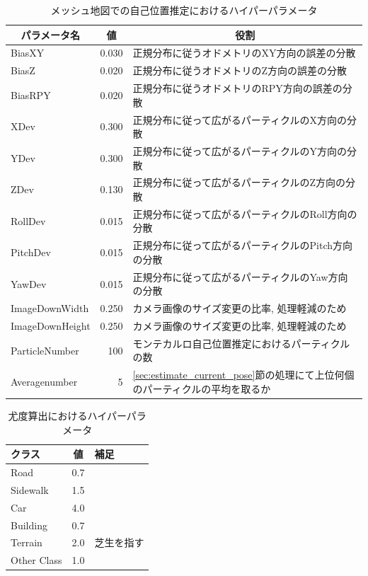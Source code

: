 \begin{table}[htbp]
\begin{center}
\caption{メッシュ地図での自己位置推定におけるハイパーパラメータ}
  \begin{tabular}{l|r|l} \hline
    \multicolumn{1}{c|}{パラメータ名} & \multicolumn{1}{c|}{値} & \multicolumn{1}{c}{役割} \\ \hline
    BiasXY & 0.030 & 正規分布に従うオドメトリのXY方向の誤差の分散 \\
    BiasZ & 0.020 & 正規分布に従うオドメトリのZ方向の誤差の分散 \\
    BiasRPY & 0.020 & 正規分布に従うオドメトリのRPY方向の誤差の分散 \\
    XDev & 0.300 & 正規分布に従って広がるパーティクルのX方向の分散 \\
    YDev & 0.300 & 正規分布に従って広がるパーティクルのY方向の分散 \\
    ZDev & 0.130 & 正規分布に従って広がるパーティクルのZ方向の分散 \\
    RollDev & 0.015 & 正規分布に従って広がるパーティクルのRoll方向の分散 \\
    PitchDev & 0.015 & 正規分布に従って広がるパーティクルのPitch方向の分散 \\
    YawDev & 0.015 & 正規分布に従って広がるパーティクルのYaw方向の分散 \\
    ImageDownWidth & 0.250 & カメラ画像のサイズ変更の比率, 処理軽減のため \\
    ImageDownHeight & 0.250 & カメラ画像のサイズ変更の比率, 処理軽減のため \\
    ParticleNumber & 100 & モンテカルロ自己位置推定におけるパーティクルの数 \\
    Averagenumber & 5 & \ref{sec:estimate_current_pose}節の処理にて上位何個のパーティクルの平均を取るか \\ \hline
  \end{tabular}
  \label{tab:MCL_parameter}
\end{center}
\end{table}

\begin{table}[htbp]
\begin{center}
\caption{尤度算出におけるハイパーパラメータ}
  \begin{tabular}{l c l} \hline
    クラス & 値 & 補足\\ \hline
    Road & 0.7 & \\
    Sidewalk & 1.5 & \\
    Car & 4.0 & \\
    Building & 0.7 & \\
    Terrain & 2.0 & 芝生を指す\\
    Other Class & 1.0 & \\ \hline
  \end{tabular}
  \label{tab:likelihood_parameter}
\end{center}
\end{table}
